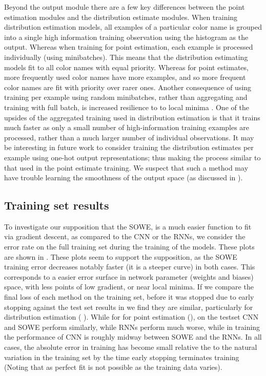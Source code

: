 \documentclass[11pt,a4paper]{article}
\begin{document}
Beyond the output module there are a few key differences between the point estimation modules and the distribution estimate modules.
When training distribution estimation models, all examples of a particular color name is grouped into a single high information training observation using the histogram as the output.
Whereas when training for point estimation, each example is processed individually (using minibatches).
This means that the distribution estimating models fit to all color names with equal priority. %
Whereas for point estimates, more frequently used color names have more examples, and so more frequent color names are fit with priority over rarer ones.
Another consequence of using training per example using random minibatches, rather than aggregating and training with full batch, is increased resilience to to local minima \parencite{lecun2012efficient}.
One of the upsides of the aggregated training used in distribution estimation is that it trains much faster as only a small number of high-information training examples are processed, rather than a much larger number of individual observations.
It may be interesting in future work to consider training the distribution estimates per example using one-hot output representations; thus making the process similar to that used in the point estimate training.
We suspect that such a method may have trouble learning the smoothness of the output space (as discussed in ).


\subsection{Training set results}

To investigate our supposition that the SOWE, is a much easier function to fit via gradient descent, as compared to the CNN or the RNNs, we consider the error rate on the full training set during the training of the models.
These plots are shown in .
These plots seem to support the supposition, as the SOWE training error decreases notably faster (it is a steeper curve) in both cases.
This corresponds to a easier error surface in network parameter (weights and biases) space, with less points of low gradient, or near local minima.
If we compare the final loss of each method on the training set, before it was stopped due to early stopping against the test set results in  
we find they are similar,  particularly for distribution estimation ( ).
While for for point estimation (), on the testset CNN and SOWE perform similarly, while RNNs perform much worse, while in training the performance of CNN is roughly midway between SOWE and the RNNs.
In all cases, the absolute error in training has become small relative the to the natural variation in the training set by the time early stopping terminates training (Noting that as perfect fit is not possible as the training data varies).
\end{document}
